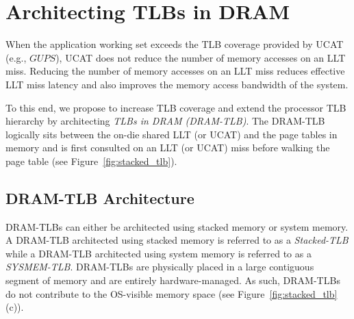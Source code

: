 \section{Architecting TLBs in DRAM } 
\label{sec:stackedTLB}

\noindent When the application working set exceeds the TLB coverage
provided by UCAT (e.g., $GUPS$), UCAT does not reduce the number of
memory accesses on an LLT miss. Reducing the number of memory accesses
on an LLT miss reduces effective LLT miss latency and also improves the memory 
access bandwidth of the system.

To this end, we propose to increase TLB coverage and
extend the processor TLB hierarchy by architecting {\em TLBs in DRAM
(DRAM-TLB)}. The DRAM-TLB logically sits between the on-die shared LLT
(or UCAT) and the page tables in memory and is first consulted on an
LLT (or UCAT) miss before walking the page table (see
Figure~\ref{fig:stacked_tlb}).


\begin{figure*}[t] 
  \vspace{-0. in} \centering
   \centerline{}

  \caption{\small Improving TLB coverage by embedding TLBs in DRAM
    (DRAM-TLB). A DRAM-TLB architected using commodity DRAM is called
    SYSMEM-TLB and a DRAM-TLB architected with stacked DRAM is called
    Stacked-TLB. \normalsize}
  \label{fig:stacked_tlb} 
  \vspace{-0. in}
\end{figure*}

\subsection{DRAM-TLB Architecture}

\noindent DRAM-TLBs can either be architected using stacked memory or
system memory. A DRAM-TLB architected using stacked memory is referred
to as a {\em Stacked-TLB} while a DRAM-TLB architected using system
memory is referred to as a {\em SYSMEM-TLB}. DRAM-TLBs are physically
placed in a large contiguous segment of memory and are entirely
hardware-managed. As such, DRAM-TLBs do not contribute to the
OS-visible memory space (see Figure~\ref{fig:stacked_tlb}(c)).

